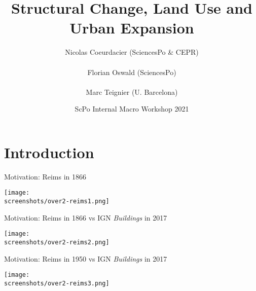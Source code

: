 \documentclass[aspectratio=169]{beamer}
\begin{document}
\title{\textbf{Structural Change, Land Use and Urban Expansion}}
\author{Nicolas Coeurdacier (SciencesPo \& CEPR)\\ \ \\Florian Oswald (SciencesPo) \\ \ \\ Marc Teignier (U. Barcelona)}
\date{ScPo Internal Macro Workshop 2021}


\frame{\titlepage}



\section{Introduction}

\begin{frame}{Motivation: Reims in 1866}
\begin{adjustbox}{center}
\texttt{[image: \\screenshots/over2-reims1.png]}\end{adjustbox}
\end{frame}

\begin{frame}{Motivation: Reims in 1866 vs IGN \emph{Buildings} in 2017}
\begin{adjustbox}{center}
\texttt{[image: \\screenshots/over2-reims2.png]}\end{adjustbox}
\end{frame}

\begin{frame}{Motivation: Reims in 1950 vs IGN \emph{Buildings} in 2017}
\begin{adjustbox}{center}
\texttt{[image: \\screenshots/over2-reims3.png]}\end{adjustbox}
\end{frame}

\end{document}

